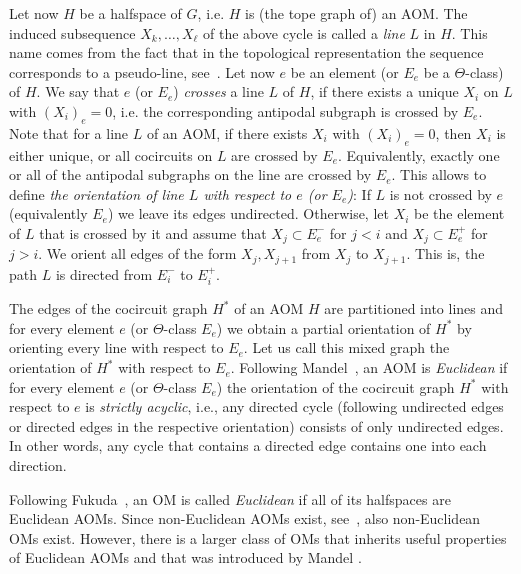 \documentclass[final,11pt]{article}
\newcommand{\comment}[1]{\textcolor{red}{#1}}
\begin{document}
Let now $H$ be a halfspace  of $G$, i.e. $H$ is (the tope graph of) an AOM. The induced subsequence $X_k,\ldots,X_{\ell}$ of the above cycle is called a \emph{line} $L$ in $H$. This name comes from the fact that in the topological representation the sequence corresponds to a pseudo-line, see~\cite{Man-82}.
Let now $e$ be an element (or $E_e$ be a $\Theta$-class) of $H$. We say that $e$ (or $E_e$) \emph{crosses} a line $L$ of $H$, if there exists a unique $X_i$ on $L$ with $(X_i)_e = 0$, i.e. the corresponding antipodal subgraph  is crossed by $E_e$. Note that for a line $L$ of an AOM, if there exists $X_i$ with $(X_i)_e = 0$, then $X_i$ is either unique, or all cocircuits on $L$ are crossed by $E_e$. Equivalently, exactly one or all of the antipodal subgraphs on the line are crossed by $E_e$. This allows to define 
\emph{the orientation of line $L$ with respect to $e$ (or $E_e$)}: If $L$ is not crossed by $e$ (equivalently $E_e$) we leave its edges undirected. Otherwise, let $X_i$ be the element of $L$ that is crossed by it and assume that $X_j\subset E_e^-$ for $j<i$ and $X_j\subset E_e^+$ for $j>i$. We orient all edges of the form $X_j, X_{j+1}$ from $X_j$ to $X_{j+1}$. This is, the path $L$ is directed from $E_i^-$ to $E_i^+$.

 
The edges of the cocircuit graph $H^*$ of an AOM $H$ are partitioned into lines and for every element $e$ (or $\Theta$-class $E_e$) we obtain a partial orientation of $H^*$ by orienting every line with respect to $E_e$. Let us call this mixed graph the orientation of $H^*$ with respect to $E_e$.
Following Mandel~\cite[Theorem 6]{Man-82}, an AOM is \emph{Euclidean} if for every element $e$ (or $\Theta$-class $E_e$) the orientation of the cocircuit graph $H^*$ with respect to $e$ is \emph{strictly acyclic}, i.e., {any directed cycle (following undirected edges or directed edges in the respective orientation) consists of only undirected edges.} In other words, any cycle  that contains a directed edge contains one into each direction. %

Following Fukuda~\cite{Fuk-82}, an OM is called \emph{Euclidean} if all of its halfspaces are Euclidean AOMs. Since non-Euclidean AOMs exist, see~\cite{Fuk-82,Man-82}, also non-Euclidean OMs exist. However, there is a larger class of OMs that inherits useful properties of Euclidean AOMs and that was introduced by Mandel \cite{Man-82}.
\end{document}
